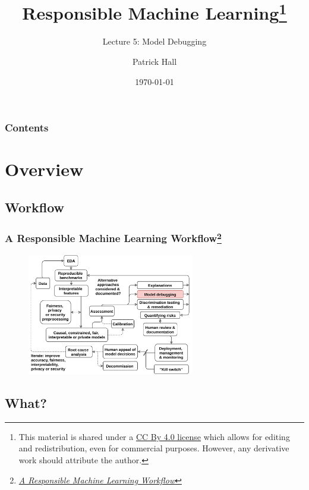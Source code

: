 \documentclass[11pt,
               aspectratio=169,
               hyperref={colorlinks}
               ]{beamer}
\author{Patrick Hall}
\title{Responsible Machine Learning\footnote{\tiny{This material is shared under a \href{https://creativecommons.org/licenses/by/4.0/deed.ast}{CC By 4.0 license} which allows for editing and redistribution, even for commercial purposes. However, any derivative work should attribute the author.}}}
\subtitle{Lecture 5: Model Debugging}
\institute{The George Washington University}
\date{\today}
\begin{document}
	
	\maketitle
	
	\begin{frame}
	
		\frametitle{Contents}
		
		\tableofcontents{}
		
	\end{frame}
	
	
	\section{Overview}
		\subsection{Workflow} %
			
		\begin{frame}
		
			\frametitle{A Responsible Machine Learning Workflow\footnote{\href{https://www.mdpi.com/2078-2489/11/3/137/htm}{\textit{A Responsible Machine Learning Workflow}}}}
			
			\begin{figure}[htb]
				\begin{center}
					\includegraphics[height=150pt]{../img/rml_diagram_lec4_hilite.png}
					\label{fig:blueprint}
				\end{center}
			\end{figure}		
					
		\end{frame}	


		\subsection{What?}
\end{document}
